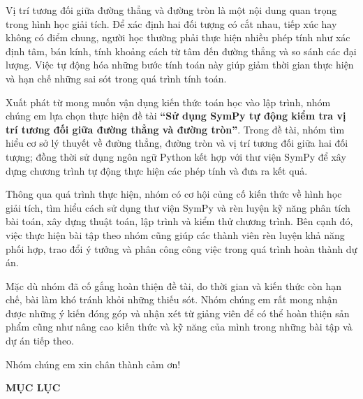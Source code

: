 \documentclass[12pt,a4paper]{article}
\begin{document}
Vị trí tương đối giữa đường thẳng và đường tròn là một nội dung quan trọng trong hình học giải tích. Để xác định hai đối tượng có cắt nhau, tiếp xúc hay không có điểm chung, người học thường phải thực hiện nhiều phép tính như xác định tâm, bán kính, tính khoảng cách từ tâm đến đường thẳng và so sánh các đại lượng. Việc tự động hóa những bước tính toán này giúp giảm thời gian thực hiện và hạn chế những sai sót trong quá trình tính toán.

Xuất phát từ mong muốn vận dụng kiến thức toán học vào lập trình, nhóm chúng em lựa chọn thực hiện đề tài \textbf{``Sử dụng SymPy tự động kiểm tra vị trí tương đối giữa đường thẳng và đường tròn''}. Trong đề tài, nhóm tìm hiểu cơ sở lý thuyết về đường thẳng, đường tròn và vị trí tương đối giữa hai đối tượng; đồng thời sử dụng ngôn ngữ Python kết hợp với thư viện SymPy để xây dựng chương trình tự động thực hiện các phép tính và đưa ra kết quả.

Thông qua quá trình thực hiện, nhóm có cơ hội củng cố kiến thức về hình học giải tích, tìm hiểu cách sử dụng thư viện SymPy và rèn luyện kỹ năng phân tích bài toán, xây dựng thuật toán, lập trình và kiểm thử chương trình. Bên cạnh đó, việc thực hiện bài tập theo nhóm cũng giúp các thành viên rèn luyện khả năng phối hợp, trao đổi ý tưởng và phân công công việc trong quá trình hoàn thành dự án.

Mặc dù nhóm đã cố gắng hoàn thiện đề tài, do thời gian và kiến thức còn hạn chế, bài làm khó tránh khỏi những thiếu sót. Nhóm chúng em rất mong nhận được những ý kiến đóng góp và nhận xét từ giảng viên để có thể hoàn thiện sản phẩm cũng như nâng cao kiến thức và kỹ năng của mình trong những bài tập và dự án tiếp theo.

Nhóm chúng em xin chân thành cảm ơn!


\newpage

\begin{center}
    \textbf{\Large MỤC LỤC}
\end{center}

\vspace{0.5cm}

\tableofcontents

\newpage


\end{document}
